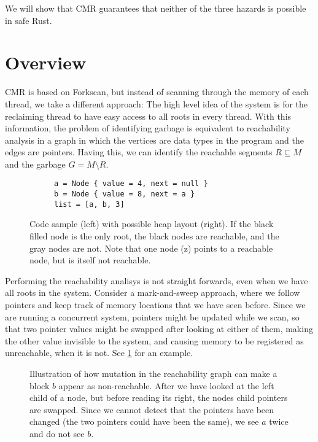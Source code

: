 We will show that CMR guarantees that neither of the three hazards is possible in safe Rust.

\section{Overview\label{sec:cmr-overview}}

CMR is based on Forkscan\cite{alistarh2017forkscan}, but instead of scanning through the memory of
each thread, we take a different approach: The high level idea of the system is for the reclaiming
thread to have easy access to all roots in every thread. With this information, the problem of
identifying garbage is equivalent to reachability analysis in a graph in which the vertices are
data types in the program and the edges are pointers. Having this, we can identify the reachable
segments $R \subseteq M$ and the garbage $G = M \setminus R$.

\begin{figure}[ht]
  \centering
  \begin{subfigure}{0.45\textwidth}
    \begin{lstlisting}
a = Node { value = 4, next = null }
b = Node { value = 8, next = a }
list = [a, b, 3]
    \end{lstlisting}
  \end{subfigure}
  \hfill
  \begin{subfigure}{0.45\textwidth}
    
  \end{subfigure}
  \caption{Code sample (left) with possible heap layout (right). If the black filled node is the
  only root, the black nodes are reachable, and the gray nodes are not. Note that one node (z)
  points to a reachable node, but is itself not reachable.}
\end{figure}

Performing the reachability analisys is not straight forwards, even when we have all roots in the
system. Consider a mark-and-sweep approach, where we follow pointers and keep track of memory
locations that we have seen before. Since we are running a concurrent system, pointers might be
updated while we scan, so that two pointer values might be swapped after looking at either of them,
making the other value invisible to the system, and causing memory to be registered as unreachable,
when it is not. See \cref{fig:pointer-swap} for an example.

\begin{figure}[ht]
  \centering
  
  \caption{Illustration of how mutation in the reachability graph can make a block $b$ appear as
  non-reachable. After we have looked at the left child of a node, but before reading its right,
  the nodes child pointers are swapped. Since we cannot detect that the pointers have been changed
  (the two pointers could have been the same), we see $a$ twice and do not see $b$.%
  \label{fig:pointer-swap}}
\end{figure}

